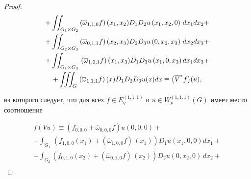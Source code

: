 \begin{proof}
\begin{multline}
+\iint_{G_1 \times G_2 }\left( \overline{\omega }_{1, 1, 0}f\right)

( x_1 ,x_2 ) D_1 D_2 u\left( x_1 ,x_2 ,0\right)

\,dx_1 dx_2 +

\\

+\iint_{G_2 \times G_3 }\left( \overline{\omega }%

_{0, 1, 1}f\right) ( x_2 ,x_3 ) D_2 D_3 u\left(

0,x_2 ,x_3 \right) \,dx_2 dx_3 +

\\

+\iint_{G_1 \times G_3 }\,\left( \overline{\omega }_{1, 0, 1}f\right) {%

( x_1 ,x_3 ) D_1 D_3 }u\left( x_1 ,0,x_3 \right)  dx_1 dx_3 +

\\

+\iiint_{G}\,\left( \overline{\omega }%

_{1, 1, 1}f\right) (x) D_1 D_2 D_3 u(x)dx\equiv \bigl( \overline{V}^{\ast }f\bigr) (u),

\end{multline}

из которого следует, что для всех $f\in E_{q}^{(1, 1, 1) }$ и $u\in W_{p}^{\left(

1, 1, 1\right) }(G)$ имеет место соотношение

\begin{multline}

\label{mam:11}

f\left( Vu\right) \equiv\left( f_{0, 0, 0}+\overline{\omega }_{0, 0, 0}f\right)

u( 0, 0, 0) +

\\

{+\int_{G_1 }\,\left( f_{1, 0, 0}( x_1) +\left( \overline{\omega

}_{1, 0, 0}f\right) \,( x_1) \right) D_1 u\left(

x_1 , 0, 0\right) dx_1 +}

\\

{+\int_{G_2 }\left( f_{0, 1, 0}( x_2) +\left( \overline{\omega }%

_{0, 1, 0}f\right) \,( x_2) \right) D_2 u\left( 0, x_2 , 0\right)

\,dx_2 +}

\\


\end{multline}
\end{proof}
